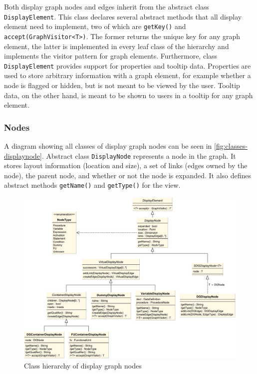 Both display graph nodes and edges inherit from the abstract class \lstinline|DisplayElement|. This class declares 
several abstract methods that all display element need to implement, two of which are \lstinline|getKey()| and 
\lstinline|accept(GraphVisitor<T>)|. The former returns the unique key for any graph element, the latter is 
implemented in every leaf class of the hierarchy and implements the visitor pattern for graph elements. Furthermore, 
class \lstinline|DisplayElement| provides support for properties and tooltip data. Properties are used to store 
arbitrary information with a graph element, for example whether a node is flagged or hidden, but is not meant to be 
viewed by the user. Tooltip data, on the other hand, is meant to be shown to users in a tooltip for any graph element.

\subsubsection{Nodes}

A diagram showing all classes of display graph nodes can be seen in \autoref{fig:classes-displaynode}. Abstract class 
\lstinline|DisplayNode| represents a node in the graph. It stores layout information (location and size), a set of 
links (edges owned by the node), the parent node, and whether or not the node is expanded. It also defines abstract 
methods \lstinline|getName()| and \lstinline|getType()| for the view.

\begin{figure}
  \centering
    \includegraphics[scale=0.5]{bilder/classes-displaynode}
  \caption{Class hierarchy of display graph nodes}
  \label{fig:classes-displaynode}
\end{figure}

